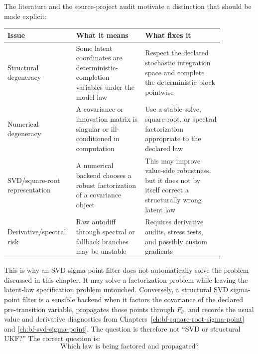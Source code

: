 The literature and the source-project audit motivate a distinction that should
be made explicit:
\begin{center}
\begin{tabular}{p{0.22\linewidth}p{0.30\linewidth}p{0.34\linewidth}}
\toprule
\textbf{Issue} & \textbf{What it means} & \textbf{What fixes it}\\
\midrule
Structural degeneracy & Some latent coordinates are deterministic-completion variables under the model law & Respect the declared stochastic integration space and complete the deterministic block pointwise\\
Numerical degeneracy & A covariance or innovation matrix is singular or ill-conditioned in computation & Use a stable solve, square-root, or spectral factorization appropriate to the declared law\\
SVD/square-root representation & A numerical backend chooses a robust factorization of a covariance object & This may improve value-side robustness, but it does not by itself correct a structurally wrong latent law\\
Derivative/spectral risk & Raw autodiff through spectral or fallback branches may be unstable & Requires derivative audits, stress tests, and possibly custom gradients\\
\bottomrule
\end{tabular}
\end{center}
This is why an SVD sigma-point filter does not automatically solve the problem
discussed in this chapter.  It may solve a factorization problem while leaving
the latent-law specification problem untouched.  Conversely, a structural SVD
sigma-point filter is a sensible backend when it factors the covariance of the
declared pre-transition variable, propagates those points through
$F_\theta$, and records the usual value and derivative diagnostics from
Chapters~\ref{ch:bf-square-root-sigma-point} and
\ref{ch:bf-svd-sigma-point}.  The question is therefore not
``SVD or structural UKF?''  The correct question is:
\[
  \text{Which law is being factored and propagated?}
\]

